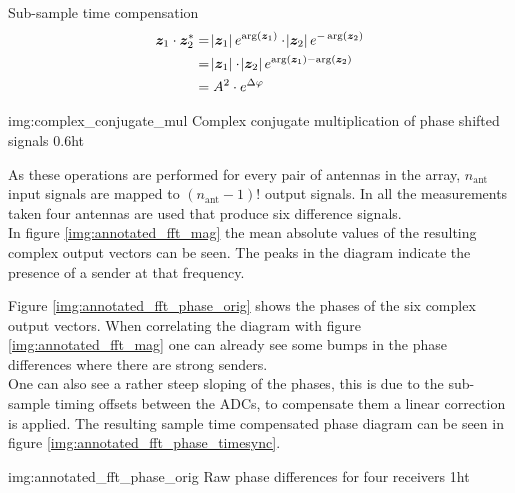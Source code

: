 \begin{subchapter}{Sub-sample time compensation}
  \begin{equation}
    \label{eq:multiply_cplx_conj}
    \begin{split}
      \bm{z}_\text{1} \cdot \bm{z}_\text{2}^{\ast}
      & = \abs{\bm{z}_\text{1}} e^{\arg(\bm{z}_\text{1})}
        \cdot
        \abs{\bm{z}_\text{2}} e^{-\arg(\bm{z}_\text{2})} \\
      & = \abs{\bm{z}_\text{1}} \cdot \abs{\bm{z}_\text{2}}
        e^{\arg(\bm{z}_\text{1}) - \arg(\bm{z}_\text{2})} \\
      & = A^{2} \cdot e^{\Delta \varphi}
    \end{split}
  \end{equation}

               {img:complex_conjugate_mul}
               {Complex conjugate multiplication of phase shifted signals}
               {0.6}{ht}

  As these operations are performed for every pair
  of antennas in the array, $n_\text{ant}$ input
  signals are mapped to $\left(n_\text{ant}-1\right)!$
  output signals.
  In all the measurements taken four antennas are used
  that produce six difference signals. \\

  In figure \ref{img:annotated_fft_mag} the mean
  absolute values of the resulting complex output
  vectors can be seen. The peaks in the diagram indicate
  the presence of a sender at that frequency.

  Figure \ref{img:annotated_fft_phase_orig} shows the phases
  of the six complex output vectors. When correlating the
  diagram with figure \ref{img:annotated_fft_mag} one can already
  see some bumps in the phase differences where there are strong senders. \\

  One can also see a rather steep sloping of the phases,
  this is due to the sub-sample timing offsets between the
  ADCs, to compensate them a linear correction is applied.
  The resulting sample time compensated phase diagram can be seen in
  figure \ref{img:annotated_fft_phase_timesync}.

               {img:annotated_fft_phase_orig}
               {Raw phase differences for four receivers}
               {1}{ht}
\end{subchapter}

